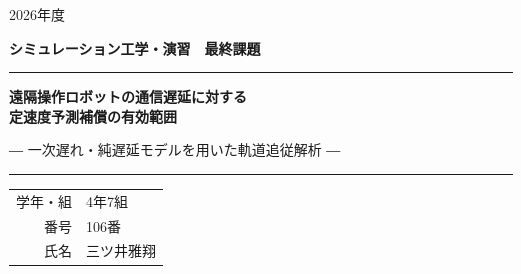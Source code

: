 \begin{titlepage}
  \thispagestyle{empty}
  \centering

  {\large 2026年度\par}
  \vspace{0.7em}
  {\Large\bfseries シミュレーション工学・演習　最終課題\par}

  \vfill

  \rule{0.82\textwidth}{0.8pt}\par
  \vspace{1.8em}
  {\LARGE\bfseries
    遠隔操作ロボットの通信遅延に対する\\[0.35em]
    定速度予測補償の有効範囲\par}
  \vspace{1.2em}
  {\large
    ― 一次遅れ・純遅延モデルを用いた軌道追従解析 ―\par}
  \vspace{1.8em}
  \rule{0.82\textwidth}{0.8pt}\par

  \vfill

  {\large
  \begin{tabular}{@{}rl@{}}
    学年・組 & 4年7組 \\[0.8em]
    番号     & 106番 \\[0.8em]
    氏名     & 三ツ井雅翔
  \end{tabular}\par}

  \vspace{2.2cm}
\end{titlepage}
